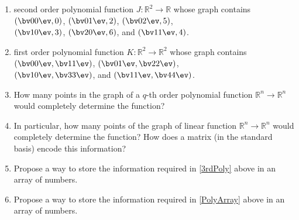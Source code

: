 \begin{enumerate}
\begin{enumerate}
\item second order polynomial function $J:\mathbb{R}^2 \to \mathbb{R}$ whose graph contains 
$\left(  \bv 0\\0 \ev , 0\right)$,  %
$\left(  \bv 0\\1 \ev , 2\right)$, %
$\left(  \bv 0\\2 \ev , 5\right)$, \\[.2cm]
$\left(  \bv 1\\0 \ev , 3\right)$,   %
$\left(  \bv 2\\0 \ev , 6\right)$,  and %
$\left(  \bv 1\\1 \ev , 4\right)$. %

\item  first order polynomial function $K:\mathbb{R}^2 \to \mathbb{R}^2 $ whose graph contains 
$\left(  \bv 0\\0 \ev , \bv 1\\1 \ev \right)$, 
$\left(  \bv 0\\1 \ev , \bv 2\\2 \ev\right)$, \\[.2cm]
$\left(  \bv 1\\0 \ev , \bv 3\\3 \ev  \right)$,  and
$\left(  \bv 1\\1 \ev , \bv 4\\4 \ev\right)$.
\\

\item \label{PolyArray}How many points in the graph of a $q$-th order polynomial function $\mathbb{R}^n \to \mathbb{R}^n$ would completely determine the function? 


\item In particular, how many points of the graph of linear function $\mathbb{R}^n \to \mathbb{R}^n$ would completely determine the function? How does a matrix (in the standard basis) encode this information?

\item Propose a way to store the information required in \ref{3rdPoly} above in an array of numbers.

\item Propose a way to store the information required in \ref{PolyArray} above in an array of numbers.
\end{enumerate}






\end{enumerate}

